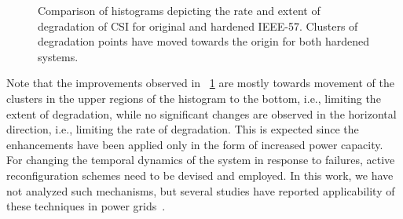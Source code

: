 \documentclass[review]{elsarticle}
\begin{document}
\begin{figure}[!ht]
\centering
{}
\caption{Comparison of histograms depicting the rate and extent of degradation of CSI for original and hardened IEEE-57. Clusters of degradation points have moved towards the origin for both hardened systems.}
\label{fig:ieee57_hist_csi_comp}
\end{figure}

Note that the improvements observed in \figurename~\ref{fig:ieee57_hist_csi_comp} are mostly towards movement of the clusters in the upper regions of the histogram to the bottom, i.e., limiting the extent of degradation, while no significant changes are observed in the horizontal direction, i.e., limiting the rate of degradation. This is expected since the enhancements have been applied only in the form of increased power capacity. For changing the temporal dynamics of the system in response to failures, active reconfiguration schemes need to be devised and employed. In this work, we have not analyzed such mechanisms, but several studies have reported applicability of these techniques in power grids~\cite{PaY13}.
\end{document}
